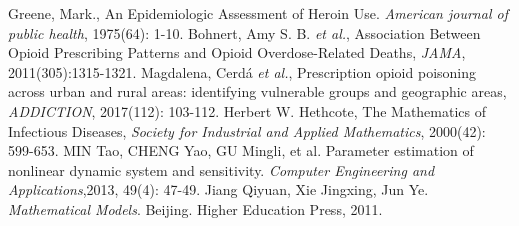 \begin{thebibliography}{99}
Greene, Mark., An Epidemiologic Assessment of Heroin Use. \emph{American journal of public health}, 1975(64): 1-10.
Bohnert, Amy S. B. \emph{et al.}, Association Between Opioid Prescribing Patterns and Opioid Overdose-Related Deaths, \emph{JAMA}, 2011(305):1315-1321.
Magdalena, Cerdá \emph{et al.}, Prescription opioid poisoning across urban and rural areas: identifying vulnerable groups and geographic areas, \emph{ADDICTION}, 2017(112): 103-112.
Herbert W. Hethcote, The Mathematics of Infectious Diseases, \emph{Society for Industrial and Applied Mathematics}, 2000(42): 599-653.
MIN Tao, CHENG Yao, GU Mingli, et al. Parameter estimation of nonlinear dynamic system and sensitivity. \emph{Computer Engineering and Applications},2013, 49(4): 47-49.
Jiang Qiyuan, Xie Jingxing, Jun Ye. \emph{Mathematical Models}. Beijing. Higher Education Press, 2011.
\end{thebibliography}